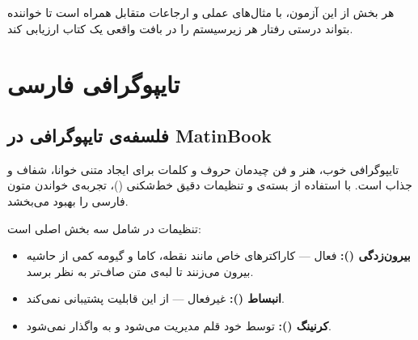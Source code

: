 \documentclass{matinbook}
\begin{document}
هر بخش از این آزمون، با مثال‌های عملی و ارجاعات متقابل
همراه است تا خواننده بتواند درستی رفتار هر زیرسیستم را
در بافت واقعی یک کتاب ارزیابی کند.

\clearpage

\tableofcontents
\clearpage

\listoffigures
\clearpage

\listoftables
\clearpage

\mainmatter
\mainmattergeometry

\chapter{تایپوگرافی فارسی}
\label{chap:typography-persian}

\section{فلسفه‌ی تایپوگرافی در MatinBook}
\label{sec:typography-philosophy}

تایپوگرافی خوب، هنر و فن چیدمان حروف و کلمات برای ایجاد
متنی خوانا، شفاف و جذاب است.  با استفاده
از بسته‌ی  و تنظیمات دقیق خط‌شکنی
()، تجربه‌ی خواندن متون فارسی را بهبود
می‌بخشد.

تنظیمات  در  شامل سه بخش اصلی است:

\begin{itemize}
    \item \textbf{بیرون‌زدگی ():} فعال — کاراکترهای خاص
    مانند نقطه، کاما و گیومه کمی از حاشیه بیرون می‌زنند
    تا لبه‌ی متن صاف‌تر به نظر برسد.
    \item \textbf{انبساط ():} غیرفعال — 
    از این قابلیت پشتیبانی نمی‌کند.
    \item \textbf{کرنینگ ():} توسط خود قلم مدیریت
    می‌شود و به  واگذار نمی‌شود.
\end{itemize}

\end{document}
